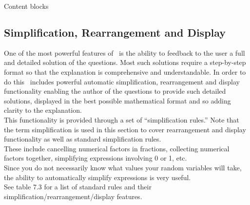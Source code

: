 \begin{chapter}{\label{cha:content_blocks}Content blocks}
  \subsection{\label{sec:simplification}Simplification, Rearrangement and Display}
One of the most powerful features of \numbas\ is the ability to feedback to the user a full and detailed solution of the questions. Most such solutions require a step-by-step format so that the explanation is comprehensive and understandable. In order to do this \numbas\ includes powerful automatic simplification, rearrangement and display functionality enabling the author of the questions to provide such detailed solutions, displayed in the best possible mathematical format and so adding clarity to the explanation.\\ 
This functionality is provided through a set of
  ``simplification rules.'' Note that the term simplification is used in this section to cover rearrangement and display functionality as well as standard simplification rules.\\   These include
  cancelling numerical factors in fractions, collecting numerical factors
  together, simplifying expressions involving 0 or 1, etc. \\Since you do not
  necessarily know what values your random variables will take, the ability to
  automatically simplify expressions is very useful.\\See table 7.3 for a list of standard rules and their simplification/rearrangement/display features.


\end{chapter}
